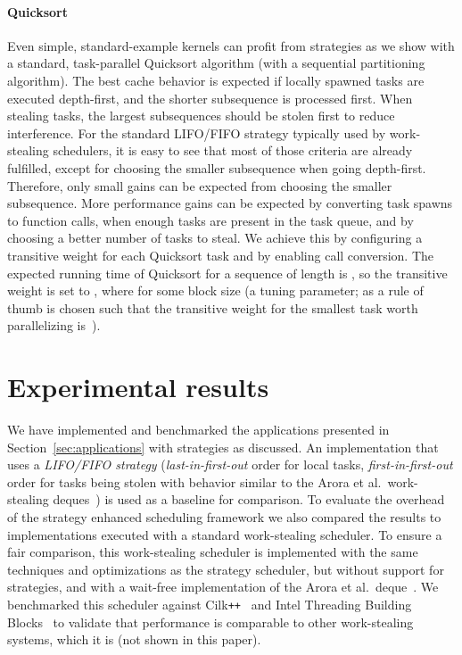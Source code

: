 \documentclass[a4paper,11pt]{article}
\begin{document}
\paragraph{Quicksort}
\label{sec:qs}

Even simple, standard-example kernels can profit from strategies as we
show with a standard, task-parallel Quicksort algorithm (with a
sequential partitioning algorithm).  The best cache behavior is
expected if locally spawned tasks are executed depth-first, and the
shorter subsequence is processed first. When stealing tasks, the
largest subsequences should be stolen first to reduce interference.
For the standard LIFO/FIFO strategy typically used by work-stealing
schedulers, it is easy to see that most of those criteria are already
fulfilled, except for choosing the smaller subsequence when going
depth-first.  Therefore, only small gains can be expected from
choosing the smaller subsequence.  More performance gains can be
expected by converting task spawns to function calls, when enough
tasks are present in the task queue, and by choosing a better number
of tasks to steal. We achieve this by configuring a transitive weight
for each Quicksort task and by enabling call conversion. The expected
running time of Quicksort for a sequence of length  is , so the transitive weight is set to , where 
for some block size  (a tuning parameter; as a rule of thumb  is
chosen such that the transitive weight for the smallest task worth
parallelizing is~).

\section{Experimental results}
\label{sec:results}

We have implemented and benchmarked the applications presented in
Section~\ref{sec:applications} with strategies as discussed.  An
implementation that uses a \emph{LIFO/FIFO strategy}
(\emph{last-in-first-out} order for local tasks,
\emph{first-in-first-out} order for tasks being stolen with behavior
similar to the Arora et al.\ work-stealing
deques~\cite{AroraBlumofePlaxton01}) is used as a baseline for
comparison.  To evaluate the overhead of the strategy enhanced
scheduling framework we also compared the results to implementations
executed with a standard work-stealing scheduler.  To ensure a fair
comparison, this work-stealing scheduler is implemented with the same
techniques and optimizations as the strategy scheduler, but without
support for strategies, and with a wait-free implementation of the
Arora et al.\ deque~\cite{AroraBlumofePlaxton01}. We benchmarked this
scheduler against Cilk\verb!++!~\cite{Leiserson10} and Intel Threading
Building Blocks~\cite{KukanovVoss07} to validate that performance is
comparable to other work-stealing systems, which it is (not shown in
this paper).
\end{document}
